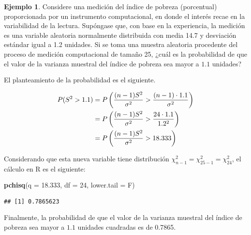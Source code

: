 \documentclass[
  11pt,
]{book}
\newenvironment{Shaded}{\begin{snugshade}}{\end{snugshade}}
\newcommand{\AttributeTok}[1]{\textcolor[rgb]{0.13,0.29,0.53}{#1}}
\newcommand{\DecValTok}[1]{\textcolor[rgb]{0.00,0.00,0.81}{#1}}
\newcommand{\FloatTok}[1]{\textcolor[rgb]{0.00,0.00,0.81}{#1}}
\newcommand{\FunctionTok}[1]{\textcolor[rgb]{0.13,0.29,0.53}{\textbf{#1}}}
\newcommand{\NormalTok}[1]{#1}
\theoremstyle{definition}
\theoremstyle{definition}
\newtheorem{example}{Ejemplo}[chapter]
\theoremstyle{definition}
\theoremstyle{definition}
\theoremstyle{remark}
\begin{document}
\begin{example}
Considere una medición del índice de pobreza (porcentual) proporcionada por un instrumento computacional, en donde el interés recae en la variabilidad de la lectura. Supóngase que, con base en la experiencia, la medición es una variable aleatoria normalmente distribuida con media 14.7 y desviación estándar igual a 1.2 unidades. Si se toma una muestra aleatoria procedente del proceso de medición computacional de tamaño 25, ¿cuál es la probabilidad de que el valor de la varianza muestral del índice de pobreza sea mayor a \(1.1\) unidades?

El planteamiento de la probabilidad es el siguiente.

\begin{equation}
\notag
\begin{split}
P(S^2 > 1.1) &= P\left(\frac{(n-1)S^2}{\sigma^2} > \frac{(n-1)\cdot 1.1}{\sigma^2}\right)\\
&= P\left(\frac{(n-1)S^2}{\sigma^2} > \frac{24\cdot 1.1}{1.2^2}\right)\\
&= P\left(\frac{(n-1)S^2}{\sigma^2} > 18.333\right)\\
\end{split}
\end{equation}

Considerando que esta nueva variable tiene distribución \(\chi^2_{n-1} = \chi^2_{25-1} = \chi^2_{24}\), el cálculo en R es el siguiente:

\begin{Shaded}
\begin{Highlighting}[]
\FunctionTok{pchisq}\NormalTok{(}\AttributeTok{q =} \FloatTok{18.333}\NormalTok{, }\AttributeTok{df =} \DecValTok{24}\NormalTok{, }\AttributeTok{lower.tail =}\NormalTok{ F)}
\end{Highlighting}
\end{Shaded}

\begin{verbatim}
## [1] 0.7865623
\end{verbatim}

Finalmente, la probabilidad de que el valor de la varianza muestral del índice de pobreza sea mayor a \(1.1\) unidades cuadradas es de 0.7865.
\end{example}
\end{document}
